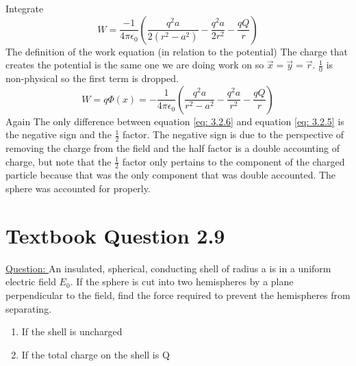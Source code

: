 \documentclass[12pt]{article}
\begin{document}
    Integrate
    \begin{equation} \label{eq: 3.2.5}
        W = \frac{-1}{4 \pi \epsilon_0} \left(\frac{q^2 a}{2(r^2-a^2)} - \frac{q^2 a}{2r^2} - \frac{q Q}{r} \right)
    \end{equation}
    The definition of the work equation (in relation to the potential)
    The charge that creates the potential is the same one we are doing work on so $\vec{x} = \vec{y} = \vec{r}$. $\frac{1}{0}$ is non-physical so the first term is dropped.
    \begin{equation} \label{eq: 3.2.6}
        W = q \Phi(x) = -\frac{1}{4 \pi \epsilon_0} \left(\frac{q^2 a}{r^2-a^2} - \frac{q^2 a}{r^2} - \frac{q Q}{r} \right) 
    \end{equation}
    Again The only difference between equation \ref{eq: 3.2.6} and equation \ref{eq: 3.2.5} is the negative sign and the $\frac{1}{2}$ factor. The negative sign is due to the perspective of removing the charge from the field and the half factor is a double accounting of charge, but note that the $\frac{1}{2}$ factor only pertains to the component of the charged particle because that was the only component that was double accounted. The sphere was accounted for properly. 




\newpage
\section{Textbook Question 2.9} \label{section4}
    \underline{Question: }
    \newline An insulated, spherical, conducting shell of radius a is in a uniform electric field $E_0$. If the sphere is cut into two hemispheres by a plane perpendicular to the field, find the force required to prevent the hemispheres from separating. 
    \begin{enumerate}
        \item [a)] If the shell is uncharged
        \item [b)] If the total charge on the shell is Q
    \end{enumerate}
\end{document}
